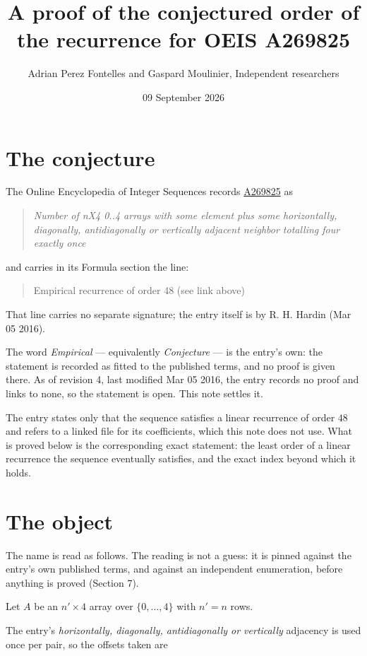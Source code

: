 \documentclass[11pt]{article}
\title{A proof of the conjectured order of the recurrence for OEIS A269825}
\author{Adrian Perez Fontelles and Gaspard Moulinier, Independent researchers}
\date{09 September 2026}
\theoremstyle{definition}
\begin{document}
\maketitle
\section{The conjecture}

The Online Encyclopedia of Integer Sequences records \href{https://oeis.org/A269825}{A269825} as

\begin{quote}\itshape Number of nX4 0..4 arrays with some element plus some horizontally, diagonally, antidiagonally or vertically adjacent neighbor totalling four exactly once\end{quote}

and carries in its Formula section the line:

\begin{quote}\ttfamily Empirical recurrence of order 48 (see link above)\end{quote}

That line carries no separate signature; the entry itself is by R. H. Hardin (Mar 05 2016).

The word {\itshape Empirical} --- equivalently {\itshape Conjecture} --- is the entry's own: the statement is recorded as fitted to the published terms, and no proof is given there. As of revision 4, last modified Mar 05 2016, the entry records no proof and links to none, so the statement is open. This note settles it.

The entry states only that the sequence satisfies a linear recurrence of order $48$ and refers to a linked file for its coefficients, which this note does not use. What is proved below is the corresponding exact statement: the least order of a linear recurrence the sequence eventually satisfies, and the exact index beyond which it holds.

\section{The object}

The name is read as follows. The reading is not a guess: it is pinned against the entry's own published terms, and against an independent enumeration, before anything is proved (Section 7).

Let $A$ be an $n' \times 4$ array over $\{0,\dots,4\}$ with $n' = n$ rows.

The entry's {\itshape horizontally, diagonally, antidiagonally or vertically} adjacency is used once per pair, so the offsets taken are
\end{document}
